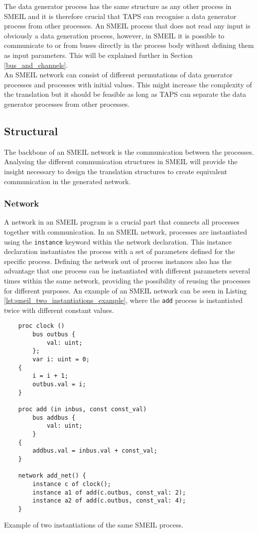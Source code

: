 The data generator process has the same structure as any other process in SMEIL and it is therefore crucial that TAPS can recognise a data generator process from other processes. An SMEIL process that does not read any input is obviously a data generation process, however, in SMEIL it is possible to communicate to or from buses directly in the process body without defining them as input parameters. This will be explained further in Section \ref{bus_and_channels}. \\

An SMEIL network can consist of different permutations of data generator processes and processes with initial values. This might increase the complexity of the translation but it should be feasible as long as TAPS can separate the data generator processes from other processes.
\subsection{Structural}
\label{sec:analysis_structural}
The backbone of an SMEIL network is the communication between the processes. Analysing the different communication structures in SMEIL will provide the insight necessary to design the translation structures to create equivalent communication in the generated \cspm{} network.
\subsubsection{Network}
A network in an SMEIL program is a crucial part that connects all processes together with communication. In an SMEIL network, processes are instantiated using the \texttt{instance} keyword within the network declaration. This instance declaration instantiates the process with a set of parameters defined for the specific process.
Defining the network out of process instances also has the advantage that one process can be instantiated with different parameters several times within the same network, providing the possibility of reusing the processes for different purposes. An example of an SMEIL network can be seen in Listing \ref{lst:smeil_two_instantiations_example}, where the \texttt{add} process is instantiated twice with different constant values.\\
\begin{listing}
    \begin{verbatim}
    proc clock ()
        bus outbus {
            val: uint;
        };
        var i: uint = 0;
    {
        i = i + 1;
        outbus.val = i;
    }

    proc add (in inbus, const const_val)
        bus addbus {
            val: uint;
        }
    {
        addbus.val = inbus.val + const_val;
    }

    network add_net() {
        instance c of clock();
        instance a1 of add(c.outbus, const_val: 2);
        instance a2 of add(c.outbus, const_val: 4);
    }
    \end{verbatim}
    \caption{Example of two instantiations of the same SMEIL process.}
    \label{lst:smeil_two_instantiations_example}
\end{listing}

